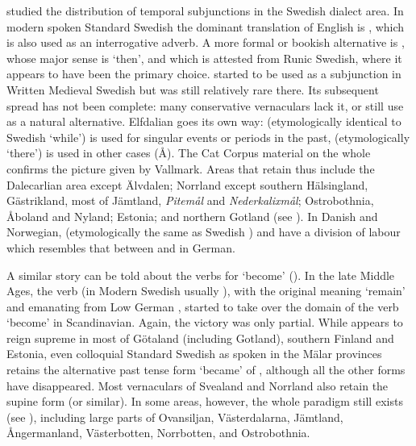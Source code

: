 \citet{Vallmark1936} studied the distribution of temporal subjunctions in the Swedish dialect area. In modern spoken Standard Swedish the dominant translation of English  is , which is also used as an interrogative adverb. A more formal or bookish alternative is , whose major sense is ‘then’, and which is attested from Runic Swedish, where it appears to have been the primary choice. started to be used as a subjunction in Written Medieval Swedish but was still relatively rare there. Its subsequent spread has not been complete: many conservative vernaculars lack it, or still use as a natural alternative. Elfdalian goes its own way:  (etymologically identical to Swedish  ‘while’) is used for singular events or periods in the past,  (etymologically ‘there’) is used in other cases (Å\citet[152]{Åkerberg2012}). The Cat Corpus material on the whole confirms the picture given by Vallmark. Areas that retain  thus include the Dalecarlian area except Älvdalen; Norrland except southern Hälsingland, Gästrikland, most of Jämtland, \textit{Pitemål} and \textit{Nederkalixmål}; Ostrobothnia, Åboland and Nyland; Estonia; and northern Gotland (see ). In Danish and Norwegian,  (etymologically the same as Swedish ) and  have a division of labour which resembles that between  and  in German. 

A similar story can be told about the verbs for ‘become’ (\citet{Markey1969}). In the late Middle Ages, the verb (in Modern Swedish usually ), with the original meaning ‘remain’ and emanating from Low German , started to take over the domain of the verb  ‘become’ in Scandinavian. Again, the victory was only partial. While appears to reign supreme in most of Götaland (including Gotland), southern Finland and Estonia, even colloquial Standard Swedish as spoken in the Mälar provinces retains the alternative past tense form  ‘became’ of , although all the other forms have disappeared. Most vernaculars of Svealand and Norrland also retain the supine form  (or similar). In some areas, however, the whole paradigm still exists (see ), including large parts of Ovansiljan, Västerdalarna, Jämtland, Ångermanland, Västerbotten, Norrbotten, and Ostrobothnia.

